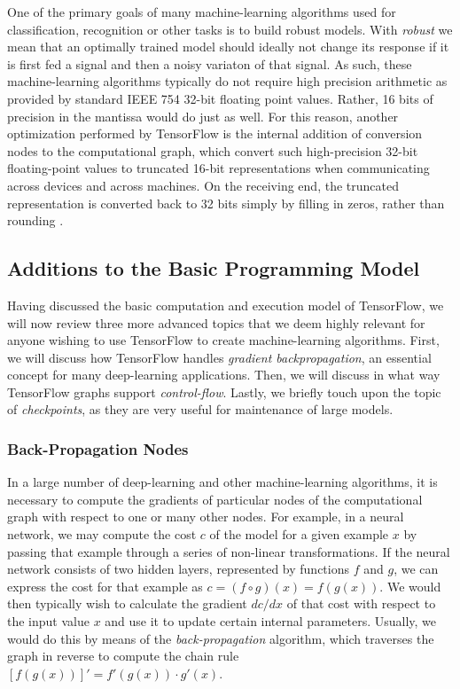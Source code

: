 One of the primary goals of many machine-learning algorithms used for
classification, recognition or other tasks is to build robust models. With
\emph{robust} we mean that an optimally trained model should ideally not change
its response if it is first fed a signal and then a noisy variaton of that
signal. As such, these machine-learning algorithms typically do not require high
precision arithmetic as provided by standard IEEE 754 32-bit floating point
values. Rather, 16 bits of precision in the mantissa would do just as well. For
this reason, another optimization performed by TensorFlow is the internal
addition of conversion nodes to the computational graph, which convert such
high-precision 32-bit floating-point values to truncated 16-bit representations
when communicating across devices and across machines. On the receiving end, the
truncated representation is converted back to 32 bits simply by filling in
zeros, rather than rounding \cite{tensorflow}.

\subsection{Additions to the Basic Programming Model}\label{sec:model-ext}

Having discussed the basic computation and execution model of TensorFlow, we
will now review three more advanced topics that we deem highly relevant for
anyone wishing to use TensorFlow to create machine-learning algorithms. First,
we will discuss how TensorFlow handles \emph{gradient backpropagation}, an
essential concept for many deep-learning applications. Then, we will discuss in
what way TensorFlow graphs support \emph{control-flow}. Lastly, we briefly touch
upon the topic of \emph{checkpoints}, as they are very useful for maintenance of
large models.

\subsubsection{Back-Propagation Nodes}\label{sec:model-ext-backprop}

In a large number of deep-learning and other machine-learning algorithms, it is
necessary to compute the gradients of particular nodes of the computational
graph with respect to one or many other nodes. For example, in a neural network,
we may compute the cost $c$ of the model for a given example $x$ by passing that
example through a series of non-linear transformations. If the neural network
consists of two hidden layers, represented by functions $f$ and $g$, we can
express the cost for that example as $c = (f \circ g)(x) = f(g(x))$. We would
then typically wish to calculate the gradient $dc/dx$ of that cost with respect
to the input value $x$ and use it to update certain internal
parameters. Usually, we would do this by means of the \emph{back-propagation}
algorithm, which traverses the graph in reverse to compute the chain rule
$[f(g(x))]' = f'(g(x)) \cdot g'(x)$.

